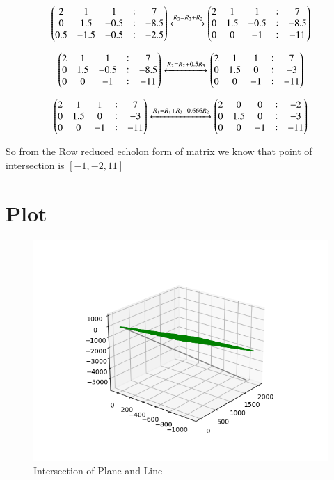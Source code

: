 \documentclass[journal,12pt,twocolumn]{IEEEtran}
\begin{document}
\begin{align}
\begin{pmatrix}2 & 1 & 1 & : & 7\\0 & 1.5 & -0.5 & : & -8.5\\ 0.5 & -1.5 & -0.5 & : & -2.5 \end{pmatrix}\xleftrightarrow{R_3=R_3+R_2}\begin{pmatrix}2 & 1 & 1 & : & 7\\0 & 1.5 & -0.5 & : & -8.5\\ 0 & 0 & -1 & : & -11 \end{pmatrix}
\end{align}

\begin{align}
\begin{pmatrix}2 & 1 & 1 & : & 7\\0 & 1.5 & -0.5 & : & -8.5\\ 0 & 0 & -1 & : & -11 \end{pmatrix}\xleftrightarrow{R_2=R_2+0.5R_3}\begin{pmatrix}2 & 1 & 1 & : & 7\\0 & 1.5 & 0 & : & -3\\ 0 & 0 & -1 & : & -11 \end{pmatrix}
\end{align}

\begin{align}
\begin{pmatrix}2&1&1&:&7\\0&1.5&0&:&-3\\0&0&-1&:&-11 \end{pmatrix}\xleftrightarrow{R_1=R_1+R_3-0.666R_2}\begin{pmatrix}2&0&0&:&-2\\0&1.5&0&:&-3\\ 0&0&-1&:&-11\end{pmatrix}
\end{align}    


So from the Row reduced echolon form of matrix we know that point of intersection is $[-1,-2,11]$

\section{Plot}
\begin{figure}[!htbp]
    \centering
    \includegraphics[width =\columnwidth]{Figure_1.png}
    \caption{Intersection of Plane and Line }
    \label{fig:1}
\end{figure}
\end{document}
